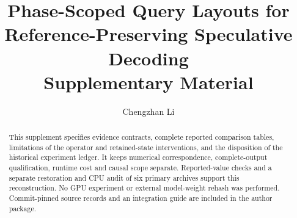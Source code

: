 \documentclass[final,5p,times,twocolumn]{elsarticle}
\begin{document}
\begin{frontmatter}
\title{Phase-Scoped Query Layouts for Reference-Preserving Speculative Decoding\\[4pt]\large Supplementary Material}
\author{Chengzhan Li}
\address{University of Electronic Science and Technology of China, Qingshuihe Campus,\\Chengdu, Sichuan 611731, China}
\begin{abstract}
This supplement specifies evidence contracts, complete reported comparison tables, limitations of the operator and retained-state interventions, and the disposition of the historical experiment ledger. It keeps numerical correspondence, complete-output qualification, runtime cost and causal scope separate. Reported-value checks and a separate restoration and CPU audit of six primary archives support this reconstruction. No GPU experiment or external model-weight rehash was performed. Commit-pinned source records and an integration guide are included in the author package.
\end{abstract}
\end{frontmatter}










\end{document}
